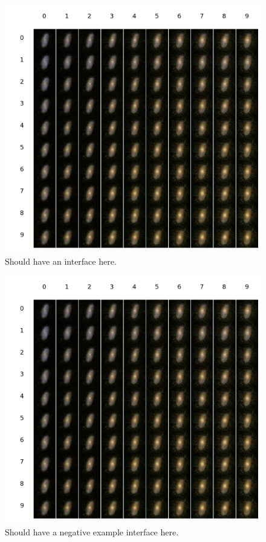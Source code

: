\documentclass[10pt,conference,letterpaper]{IEEEtran}
\begin{document}

\begin{figure}
    \centering
    \includegraphics[scale=0.2]{figure/ui.png}
    \caption{Should have an interface here.}
    \label{fig:UI}
\end{figure}


\begin{figure}
    \centering
    \includegraphics[scale=0.1]{figure/ui.png}
    \caption{Should have a negative example interface here.}
    \label{fig:UI}
\end{figure}
\end{document}
